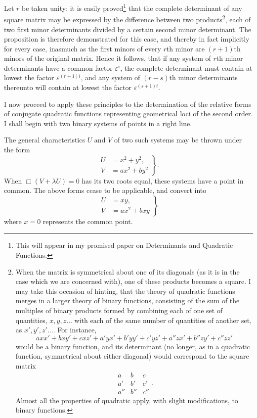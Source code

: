 \documentclass[11pt]{article}
\begin{document}
{{Let $r$ be taken unity; it is easily proved\footnote{This will appear in my promised paper on Determinants and Quadratic Functions.} that the complete determinant of any square matrix may be expressed by the difference between two products\footnote{When the matrix is symmetrical about one of its diagonals (as it is in the case which we are concerned with), one of these products becomes a square. I may take this occasion of hinting, that the theory of quadratic functions merges in a larger theory of binary functions, consisting of the sum of the multiples of binary products formed by combining each of one set of quantities, $x,y,z\ldots$ with each of the same number of quantities of another set, as $x',y',z'\ldots$. For instance,
\[
 axx'+bxy'+cxz'
 +a'yx'+b'yy'+c'yz'
 +a''zx'+b''zy'+c''zz'
\]
would be a binary function, and its determinant (no longer, as in a quadratic function, symmetrical about either diagonal) would correspond to the square matrix
\[
 \begin{array}{ccc}
 a&b&c\\
 a'&b'&c'\\
 a''&b''&c''
 \end{array}.
\]
Almost all the properties of quadratic apply, with slight modifications, to binary functions.}, each of two first minor determinants divided by a certain second minor determinant. The proposition is therefore demonstrated for this case, and thereby in fact implicitly for every case, inasmuch as the first minors of every $r$th minor are $(r+1)$th minors of the original matrix. Hence it follows, that if any system of $r$th minor determinants have a common factor $\varepsilon^i$, the complete determinant must contain at lowest the factor $\varepsilon^{(r+1)i}$, and any system of $(r-s)$th minor determinants thereunto will contain at lowest the factor $\varepsilon^{(s+1)i}$.

I now proceed to apply these principles to the determination of the relative forms of conjugate quadratic functions representing geometrical loci of the second order. I shall begin with two binary systems of points in a right line.

The general characteristics $U$ and $V$ of two such systems may be thrown under the form
\[
\left.\begin{aligned}
U&=x^2+y^2,\\
V&=ax^2+by^2
\end{aligned}\right\}.
\]
When $\Box(V+\lambda U)=0$ has its two roots equal, these systems have a point in common. The above forms cease to be applicable, and convert into
\[
\left.\begin{aligned}
U&=xy,\\
V&=ax^2+bxy
\end{aligned}\right\}
\]
where $x=0$ represents the common point.

}}
\end{document}
